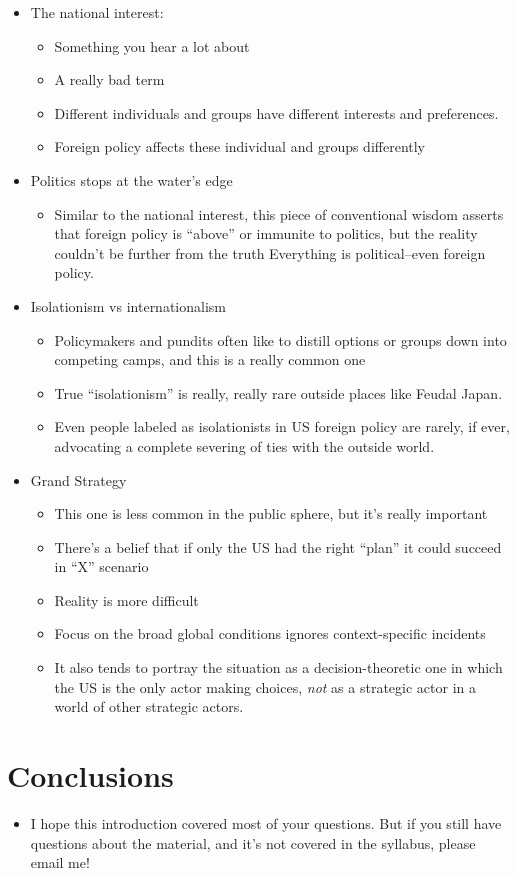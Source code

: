 \documentclass[
  12pt,
]{article}
\providecommand{\tightlist}{%
  \setlength{\itemsep}{0pt}\setlength{\parskip}{0pt}}
\begin{document}
\begin{itemize}
\item
  The national interest:

  \begin{itemize}
  \item
    Something you hear a lot about
  \item
    A really bad term
  \item
    Different individuals and groups have different interests and
    preferences.
  \item
    Foreign policy affects these individual and groups differently
  \end{itemize}
\item
  Politics stops at the water's edge

  \begin{itemize}
  \tightlist
  \item
    Similar to the national interest, this piece of conventional wisdom
    asserts that foreign policy is ``above'' or immunite to politics,
    but the reality couldn't be further from the truth Everything is
    political--even foreign policy.
  \end{itemize}
\item
  Isolationism vs internationalism

  \begin{itemize}
  \item
    Policymakers and pundits often like to distill options or groups
    down into competing camps, and this is a really common one
  \item
    True ``isolationism'' is really, really rare outside places like
    Feudal Japan.
  \item
    Even people labeled as isolationists in US foreign policy are
    rarely, if ever, advocating a complete severing of ties with the
    outside world.
  \end{itemize}
\item
  Grand Strategy

  \begin{itemize}
  \item
    This one is less common in the public sphere, but it's really
    important
  \item
    There's a belief that if only the US had the right ``plan'' it could
    succeed in ``X'' scenario
  \item
    Reality is more difficult
  \item
    Focus on the broad global conditions ignores context-specific
    incidents
  \item
    It also tends to portray the situation as a decision-theoretic one
    in which the US is the only actor making choices, \emph{not} as a
    strategic actor in a world of other strategic actors.
  \end{itemize}
\end{itemize}

\hypertarget{conclusions}{%
\section{Conclusions}\label{conclusions}}

\begin{itemize}
\tightlist
\item
  I hope this introduction covered most of your questions. But if you
  still have questions about the material, and it's not covered in the
  syllabus, please email me!
\end{itemize}
\end{document}
